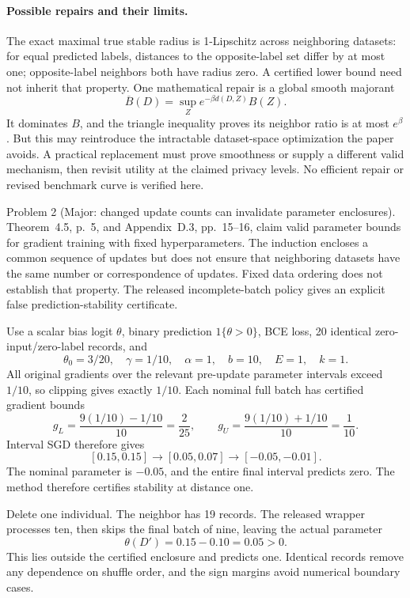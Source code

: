 \documentclass[10pt]{article}
\begin{document}
\paragraph*{Possible repairs and their limits.}\mbox{}\par
The exact maximal true stable radius is 1-Lipschitz across neighboring datasets: for equal predicted labels, distances to the opposite-label set differ by at most one; opposite-label neighbors both have radius zero. A certified lower bound need not inherit that property. One mathematical repair is a global smooth majorant \[\overline B(D)=\sup_Z e^{-\beta d(D,Z)}B(Z).\] It dominates \(B\), and the triangle inequality proves its neighbor ratio is at most \(e^\beta\). But this may reintroduce the intractable dataset-space optimization the paper avoids. A practical replacement must prove smoothness or supply a different valid mechanism, then revisit utility at the claimed privacy levels. No efficient repair or revised benchmark curve is verified here.\par
Problem 2 (Major: changed update counts can invalidate parameter enclosures).  Theorem 4.5, p. 5, and Appendix D.3, pp. 15–16, claim valid parameter bounds for gradient training with fixed hyperparameters. The induction encloses a common sequence of updates but does not ensure that neighboring datasets have the same number or correspondence of updates. Fixed data ordering does not establish that property. The released incomplete-batch policy gives an explicit false prediction-stability certificate.\par
Use a scalar bias logit \(\theta\), binary prediction \(1\{\theta>0\}\), BCE loss, 20 identical zero-input/zero-label records, and \[\theta_0=3/20,\quad \gamma=1/10,\quad
 \alpha=1,\quad b=10,\quad E=1,\quad k=1.\] All original gradients over the relevant pre-update parameter intervals exceed \(1/10\), so clipping gives exactly \(1/10\). Each nominal full batch has certified gradient bounds \[g_L=\frac{9(1/10)-1/10}{10}=\frac{2}{25},
 \qquad g_U=\frac{9(1/10)+1/10}{10}=\frac1{10}.\] Interval SGD therefore gives \[[0.15,0.15]\longrightarrow[0.05,0.07]
                 \longrightarrow[-0.05,-0.01].\] The nominal parameter is \(-0.05\), and the entire final interval predicts zero. The method therefore certifies stability at distance one.\par
Delete one individual. The neighbor has 19 records. The released wrapper processes ten, then skips the final batch of nine, leaving the actual parameter \[\theta(D')=0.15-0.10=0.05>0.\] This lies outside the certified enclosure and predicts one. Identical records remove any dependence on shuffle order, and the sign margins avoid numerical boundary cases.\par
\end{document}

